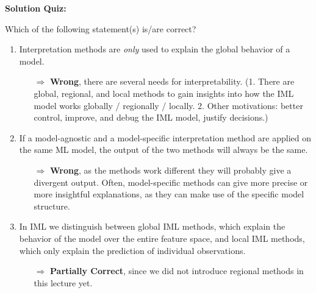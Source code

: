 \textbf{Solution Quiz:}\\\noindent
\medskip

Which of the following statement(s) is/are correct?  
	\begin{enumerate}
        \item Interpretation methods are \textit{only} used to explain the global behavior of a model.
        \begin{itemize}
        	\item[$\Rightarrow$] \textbf{Wrong}, there are several needs for interpretability. (1. There are global, regional, and local methods to gain insights into how the IML model works globally / regionally / locally. 2. Other motivations: better control, improve, and debug the IML model, justify decisions.)
        \end{itemize}
    	\item If a model-agnostic and a model-specific interpretation method are applied on the same ML model, the output of the two methods will always be the same.
    	\begin{itemize}
    		\item[$\Rightarrow$] \textbf{Wrong}, as the methods work different they will probably give a divergent output. Often, model-specific methods can give more precise or more insightful explanations, as they can make use of the specific model structure.
    	\end{itemize}
    	\item In IML we distinguish between global IML methods, which explain the behavior of the model over the entire feature space, and local IML methods, which only explain the prediction of individual observations. 
    	\begin{itemize}
    		\item[$\Rightarrow$] \textbf{Partially Correct}, since we did not introduce regional methods in this lecture yet.
    	\end{itemize}

\end{enumerate}
